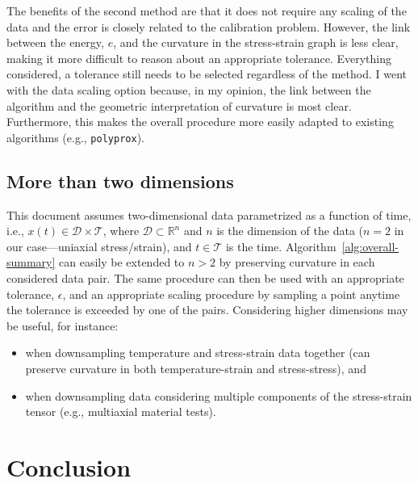 \documentclass[a4paper,11pt]{article}
\begin{document}
The benefits of the second method are that it does not require any scaling of the data and the error is closely related to the calibration problem.
However, the link between the energy, $e$, and the curvature in the stress-strain graph is less clear, making it more difficult to reason about an appropriate tolerance.
Everything considered, a tolerance still needs to be selected regardless of the method.
I went with the data scaling option because, in my opinion, the link between the algorithm and the geometric interpretation of curvature is most clear.
Furthermore, this makes the overall procedure more easily adapted to existing algorithms (e.g., \texttt{polyprox}).

\subsection{More than two dimensions}

This document assumes two-dimensional data parametrized as a function of time, i.e., $x(t) \in \mathcal{D} \times \mathcal{T}$, where $\mathcal{D} \subset \mathbb{R}^n$ and $n$ is the dimension of the data ($n = 2$ in our case---uniaxial stress/strain), and $t \in \mathcal{T}$ is the time.
Algorithm~\ref{alg:overall-summary} can easily be extended to $n > 2$ by preserving curvature in each considered data pair.
The same procedure can then be used with an appropriate tolerance, $\epsilon$, and an appropriate scaling procedure by sampling a point anytime the tolerance is exceeded by one of the pairs.
Considering higher dimensions may be useful, for instance:
\begin{itemize}
    \item when downsampling temperature and stress-strain data together (can preserve curvature in both temperature-strain and stress-stress), and
    \item when downsampling data considering multiple components of the stress-strain tensor (e.g., multiaxial material tests).
\end{itemize}

\section{Conclusion}
\end{document}
